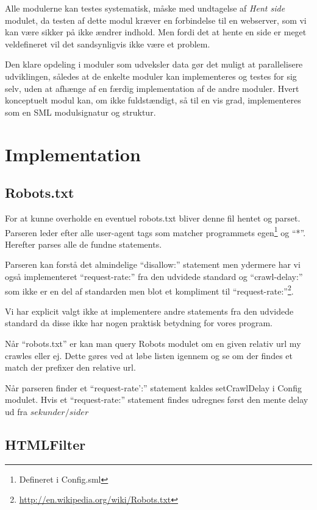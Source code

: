 \documentclass[a4paper,oneside,article]{memoir}
\begin{document}
Alle modulerne kan testes systematisk, måske med undtagelse af
\textit{Hent side} modulet, da testen af dette modul kræver en
forbindelse til en webserver, som vi kan være sikker på ikke ændrer
indhold. Men fordi det at hente en side er meget veldefineret vil det
sandsynligvis ikke være et problem.

Den klare opdeling i moduler som udveksler data gør det muligt at
parallelisere udviklingen, således at de enkelte moduler kan
implementeres og testes for sig selv, uden at afhænge af en færdig
implementation af de andre moduler. Hvert konceptuelt modul kan, om
ikke fuldstændigt, så til en vis grad, implementeres som en SML
modulsignatur og struktur.

\chapter{Implementation}

\section{Robots.txt}

For at kunne overholde en eventuel robots.txt bliver denne fil hentet
og parset.  Parseren leder efter alle user-agent tags som matcher
programmets egen\footnote{Defineret i Config.sml} og ``*''. Herefter
parses alle de fundne statements.

Parseren kan forstå det almindelige ``disallow:'' statement men
ydermere har vi også implementeret ``request-rate:'' fra den udvidede
standard og ``crawl-delay:'' som ikke er en del af standarden men blot
et kompliment til
``request-rate:''\footnote{\url{http://en.wikipedia.org/wiki/Robots.txt}}.

Vi har explicit valgt ikke at implementere andre statements fra den
udvidede standard da disse ikke har nogen praktisk betydning for vores
program.

Når ``robots.txt'' er kan man query Robots modulet om en given relativ
url my crawles eller ej. Dette gøres ved at løbe listen igennem og se
om der findes et match der prefixer den relative url.

Når parseren finder et ``request-rate':'' statement kaldes
setCrawlDelay i Config modulet. Hvis et ``request-rate:'' statement
findes udregnes først den mente delay ud fra $sekunder / sider$

\section{HTMLFilter}
\end{document}
